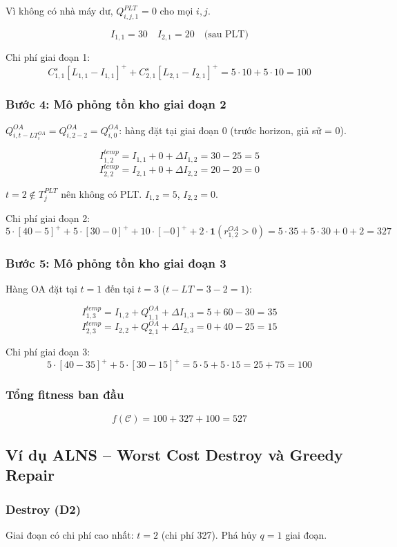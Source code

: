 \documentclass[12pt]{article}
\newcommand{\QOA}{Q^{OA}}
\newcommand{\QPLT}{Q^{PLT}}
\newcommand{\rOA}{r^{OA}}
\newcommand{\pos}[1]{\left[#1\right]^+}
\newcommand{\ind}[1]{\mathbf{1}\!\left(#1\right)}
\begin{document}
Vì không có nhà máy dư, $\QPLT_{i,j,1} = 0$ cho mọi $i,j$.

\[
I_{1,1} = 30 \quad I_{2,1} = 20 \quad \text{(sau PLT)}
\]

Chi phí giai đoạn 1:
\[
C^s_{1,1} \pos{L_{1,1} - I_{1,1}} + C^s_{2,1} \pos{L_{2,1} - I_{2,1}} = 5 \cdot 10 + 5 \cdot 10 = 100
\]

\subsubsection*{Bước 4: Mô phỏng tồn kho giai đoạn 2}

$\QOA_{i,t-LT_i^{OA}} = \QOA_{i,2-2} = \QOA_{i,0}$: hàng đặt tại giai đoạn 0 (trước horizon, giả sử = 0).

\[
I^{temp}_{1,2} = I_{1,1} + 0 + \Delta I_{1,2} = 30 - 25 = 5
\]
\[
I^{temp}_{2,2} = I_{2,1} + 0 + \Delta I_{2,2} = 20 - 20 = 0
\]

$t=2 \notin T_j^{PLT}$ nên không có PLT. $I_{1,2} = 5$, $I_{2,2} = 0$.

Chi phí giai đoạn 2:
\[
5\cdot\pos{40-5} + 5\cdot\pos{30-0} + 10\cdot\pos{-0} + 2 \cdot \ind{\rOA_{1,2} > 0}
= 5\cdot35 + 5\cdot30 + 0 + 2 = 327
\]

\subsubsection*{Bước 5: Mô phỏng tồn kho giai đoạn 3}

Hàng OA đặt tại $t=1$ đến tại $t=3$ ($t-LT = 3-2=1$):

\[
I^{temp}_{1,3} = I_{1,2} + \QOA_{1,1} + \Delta I_{1,3} = 5 + 60 - 30 = 35
\]
\[
I^{temp}_{2,3} = I_{2,2} + \QOA_{2,1} + \Delta I_{2,3} = 0 + 40 - 25 = 15
\]

Chi phí giai đoạn 3:
\[
5\cdot\pos{40-35} + 5\cdot\pos{30-15} = 5\cdot5 + 5\cdot15 = 25 + 75 = 100
\]

\subsubsection*{Tổng fitness ban đầu}

\[
f(\mathcal{C}) = 100 + 327 + 100 = 527
\]

\subsection{Ví dụ ALNS -- Worst Cost Destroy và Greedy Repair}

\subsubsection*{Destroy (D2)} Giai đoạn có chi phí cao nhất: $t=2$ (chi phí 327). Phá hủy $q=1$ giai đoạn.
\end{document}
